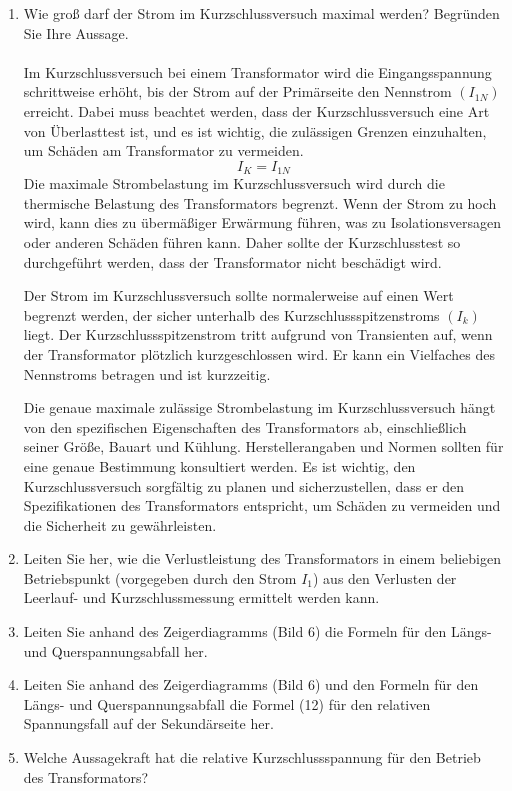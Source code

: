 \begin{enumerate}[label=\alph*)]
  \item Wie groß darf der Strom im Kurzschlussversuch maximal werden? Begründen Sie
        Ihre Aussage.\\ \ \\

        Im Kurzschlussversuch bei einem Transformator wird die Eingangsspannung
        schrittweise erhöht, bis der Strom auf der Primärseite den Nennstrom $(I_{1N})$
        erreicht. Dabei muss beachtet werden, dass der Kurzschlussversuch eine Art von
        Überlasttest ist, und es ist wichtig, die zulässigen Grenzen einzuhalten, um
        Schäden am Transformator zu vermeiden.
        \[ I_K = I_{1N} \]
        Die maximale Strombelastung im Kurzschlussversuch wird durch die thermische
        Belastung des Transformators begrenzt. Wenn der Strom zu hoch wird, kann dies
        zu übermäßiger Erwärmung führen, was zu Isolationsversagen oder anderen Schäden
        führen kann. Daher sollte der Kurzschlusstest so durchgeführt werden, dass der
        Transformator nicht beschädigt wird.

        Der Strom im Kurzschlussversuch sollte normalerweise auf einen Wert begrenzt
        werden, der sicher unterhalb des Kurzschlussspitzenstroms $(I_{k})$ liegt. Der
        Kurzschlussspitzenstrom tritt aufgrund von Transienten auf, wenn der
        Transformator plötzlich kurzgeschlossen wird. Er kann ein Vielfaches des
        Nennstroms betragen und ist kurzzeitig.

        Die genaue maximale zulässige Strombelastung im Kurzschlussversuch hängt von
        den spezifischen Eigenschaften des Transformators ab, einschließlich seiner
        Größe, Bauart und Kühlung. Herstellerangaben und Normen sollten für eine genaue
        Bestimmung konsultiert werden. Es ist wichtig, den Kurzschlussversuch
        sorgfältig zu planen und sicherzustellen, dass er den Spezifikationen des
        Transformators entspricht, um Schäden zu vermeiden und die Sicherheit zu
        gewährleisten.

  \item Leiten Sie her, wie die Verlustleistung des Transformators in einem beliebigen
        Betriebspunkt (vorgegeben durch den Strom $I_1$) aus den Verlusten der
        Leerlauf- und Kurzschlussmessung ermittelt werden kann.
  \item Leiten Sie anhand des Zeigerdiagramms (Bild 6) die Formeln für den Längs- und
        Querspannungsabfall her.
  \item Leiten Sie anhand des Zeigerdiagramms (Bild 6) und den Formeln für den Längs-
        und Querspannungsabfall die Formel (12) für den relativen Spannungsfall auf der
        Sekundärseite her.
  \item Welche Aussagekraft hat die relative Kurzschlussspannung für den Betrieb des
        Transformators?


\end{enumerate}
